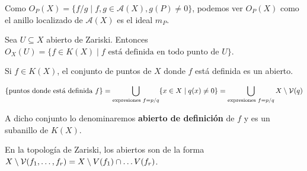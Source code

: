 \documentclass[ACGA.tex]{subfiles}
\begin{document}
\begin{nota} Como $O_P(X) = \{f/g \mid f,g \in \mathcal{A}(X), g(P) \neq 0\}$, podemos ver $O_P(X)$ como el anillo localizado de $\mathcal{A}(X)$ es el ideal $m_P$.
\end{nota}

\begin{defi}
Sea $U \subseteq X$ abierto de Zariski. Entonces $O_X(U) = \{f \in K(X) \mid f \text{ está definida en todo punto de }U\}$.
\end{defi}

\begin{prop}
Si $f \in K(X)$, el conjunto de puntos de $X$ donde $f$ está definida es un abierto.
\end{prop}

\begin{dem}
\[ \{\text{puntos donde está definida }f\} = \bigcup_{\text{expresiones }f=p/q} \{x \in X \mid q(x) \neq 0\} = \bigcup_{\text{expresiones }f=p/q} X \setminus \mathcal{V}(q) \]
\end{dem}

\begin{nota}
A dicho conjunto lo denominaremos \textbf{abierto de definición} de $f$ y es un subanillo de $K(X)$.
\end{nota}

\begin{nota}
En la topología de Zariski, los abiertos son de la forma $X \setminus \mathcal{V}(f_1,\dots,f_r) = X\setminus V(f_1) \cap \dots V(f_r)$.
\end{nota}
\end{document}
